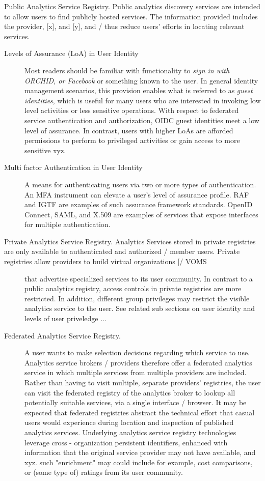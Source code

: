 Public Analytics Service Registry. Public analytics discovery
services are intended to allow users to find publicly hosted
services. The information provided includes the provider, [x], and
[y], and / thus reduce users' efforts in locating relevant services.

\begin{description}

\item[Levels of Assurance (LoA) in User Identity] Most readers should
  be familiar with functionality to {\em sign in with ORCHID, or
    Facebook} or something known to the user. In general identity
  management scenarios, this provision enables what is referred to as
  {\em guest identities}, which is useful for many users who are
  interested in invoking low level activities or less sensitive
  operations. With respect to federated service authentication and
  authorization, OIDC guest identities meet a low level of
  assurance. In contrast, users with higher LoAs are afforded
  permissions to perform to privileged activities or gain access to
  more sensitive xyz.

\item[Multi factor Authentication in User Identity] A means for
  authenticating users via two or more types of
  authentication. An MFA instrument can elevate a user’s level of
  assurance profile. RAF and IGTF are examples of such assurance
  framework standards.  OpenID Connect, SAML, and X.509 are examples
  of services that expose interfaces for multiple authentication.

\item[Private Analytics Service Registry. Analytics Services stored
  in private registries are only available to authenticated and
  authorized / member users. Private registries allow providers to
  build virtual organizations [/ VOMS] that advertise specialized
  services to its user community. In contrast to a public analytics
  registry, access controls in private registries are more
  restricted. In addition, different group privileges may restrict the
  visible analytics service to the user. See related sub sections on
  user identity and levels of user priveledge ...

\item[Federated Analytics Service Registry.] A user wants to make
  selection decisions regarding which service to use. Analytics
  service brokers / providers therefore offer a federated analytics
  service in which multiple services from multiple providers are
  included. Rather than having to visit multiple, separate providers'
  registries, the user can visit the federated registry of the
  analytics broker to lookup all potentially suitable services, via a
  single interface / browser. It may be expected that federated
  registries abstract the technical effort that casual users would
  experience during location and inspection of published analytics
  services.  Underlying analytics service registry technologies
  leverage cross - organization persistent identifiers, enhanced with
  information that the original service provider may not have
  available, and xyz. such "enrichment" may could include for example,
  cost comparisons, or (some type of) ratings from its user community.


\end{description}
